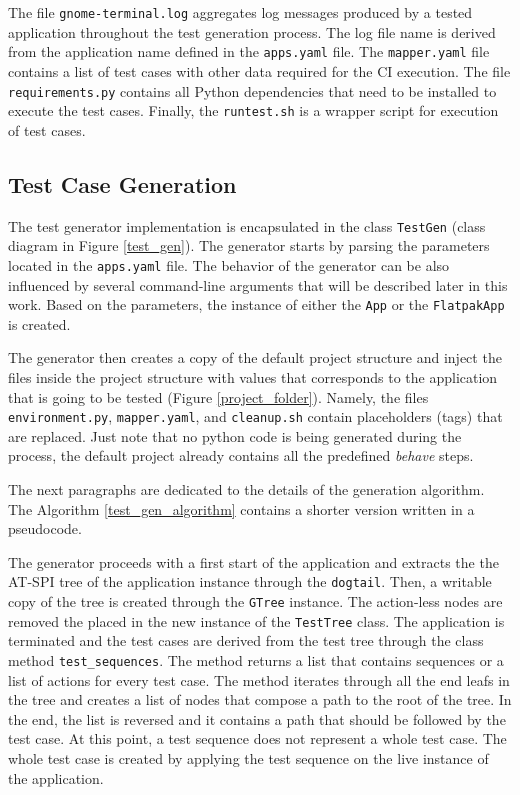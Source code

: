 The file \texttt{gnome-terminal.log} aggregates log messages produced by a tested application throughout the test generation process. The log file name is derived from the application name defined in the \texttt{apps.yaml} file. The \texttt{mapper.yaml} file contains a list of test cases with other data required for the CI execution. The file \texttt{requirements.py} contains all Python dependencies that need to be installed to execute the test cases. Finally, the \texttt{runtest.sh} is a wrapper script for execution of test cases.

\subsection{Test Case Generation}
The test generator implementation is encapsulated in the class \texttt{TestGen} (class diagram in Figure \ref{test_gen}). The generator starts by parsing the parameters located in the \texttt{apps.yaml} file. The behavior of the generator can be also influenced by several command-line arguments that will be described later in this work.  Based on the parameters, the instance of either the \texttt{App} or the \texttt{FlatpakApp} is created. 

The generator then creates a copy of the default project structure and inject the files inside the project structure with values that corresponds to the application that is going to be tested (Figure  \ref{project_folder}). Namely, the files \texttt{environment.py}, \texttt{mapper.yaml}, and \texttt{cleanup.sh} contain placeholders (tags) that are replaced. Just note that no python code is being generated during the process, the default project already contains all the predefined \textit{behave} steps.

The next paragraphs are dedicated to the details of the generation algorithm. The Algorithm \ref{test_gen_algorithm} contains a shorter version written in a pseudocode. 

The generator proceeds with a first start of the application and extracts the the AT-SPI tree of the application instance through the \texttt{dogtail}. Then, a writable copy of the tree is created through the \texttt{GTree} instance. The action-less nodes are removed the placed in the new instance of the \texttt{TestTree} class. The application is terminated and the test cases are derived from the test tree through the class method \texttt{test\_sequences}. The method returns a list that contains sequences or a list of actions for every test case. The method iterates through all the end leafs in the tree and creates a list of nodes that compose a path to the root of the tree. In the end, the list is reversed and it contains a path that should be followed by the test case. At this point, a test sequence does not represent a whole test case. The whole test case is created by applying the test sequence on the live instance of the application. 

